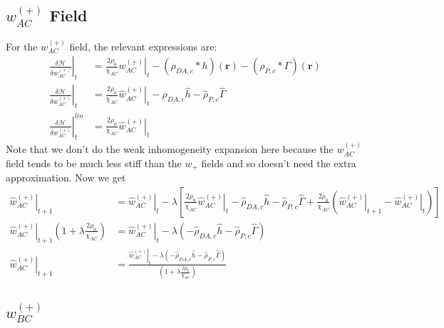 \documentclass{article}
\begin{document}
  \subsection{$w_{AC}^{(+)}$ Field}
  
  For the $w_{AC}^{(+)}$ field, the relevant expressions are:
  \begin{align*}
    \left. \frac{\delta \mathcal{H}}{\delta w_{AC}^{(+)}} \right|_t &=
      \frac{2 \rho_0}{\chi_{AC}} \left. w_{AC}^{(+)} \right|_t
      - (\rho_{DA,c} \ast h)(\mathbf{r})
      - (\rho_{P,c} \ast \Gamma)(\mathbf{r}) \\
    \left. \hat{\frac{\delta \mathcal{H}}{\delta w_{AC}^{(+)}}} \right|_t &=
      \frac{2 \rho_0}{\chi_{AC}} \left. \hat{w}_{AC}^{(+)} \right|_t
      - \hat{\rho}_{DA,c} \hat{h}
      - \hat{\rho}_{P,c}  \hat{\Gamma} \\
    \left.
      \hat{\frac{\delta \mathcal{H}}{\delta w_{AC}^{(+)}}}
    \right| ^{lin}_t &=
      \frac{2\rho_0}{\chi_{AC}} \left. \hat{w}_{AC}^{(+)} \right|_t
  \end{align*}
  Note that we don't do the weak inhomogeneity expansion here because the
    $w_{AC}^{(+)}$ field tends to be much less stiff than the $w_+$ fields and so
    doesn't need the extra approximation.
  Now we get
  \begin{align*}
    \left. \hat{w}_{AC}^{(+)} \right|_{t+1} &=
      \left. \hat{w}_{AC}^{(+)} \right|_t - \lambda \left[
        \frac{2\rho_0}{\chi_{AC}} \left. \hat{w}_{AC}^{(+)} \right|_t
        - \hat{\rho}_{DA,c} \hat{h}
        - \hat{\rho}_{P,c}  \hat{\Gamma}
        + \frac{2\rho_0}{\chi_{AC}}
          ( \left. \hat{w}_{AC}^{(+)}\right|_{t+1}
            - \left. \hat{w}_{AC}^{(+)} \right|_t
          )
      \right] \\
    \left. \hat{w}_{AC}^{(+)} \right|_{t+1} ( 1 + \lambda \frac{2
      \rho_0}{\chi_{AC}} ) &=
      \left. \hat{w}_{AC}^{(+)} \right|_t - \lambda \left(
        - \hat{\rho}_{DA,c} \hat{h}
        - \hat{\rho}_{P,c}  \hat{\Gamma}
      \right) \\
    \left. \hat{w}_{AC}^{(+)} \right|_{t+1} &=
      \frac{
        \left. \hat{w}_{AC}^{(+)} \right|_t - \lambda \left(
          - \hat{\rho}_{DA,c} \hat{h}
          - \hat{\rho}_{P,c}  \hat{\Gamma}
        \right)
      }
      {
        \left( 1 + \lambda \frac{2 \rho_0}{\chi_{AC}} \right)
      }
  \end{align*}
  
  \subsection{$w_{BC}^{(+)}$}
  
\end{document}
